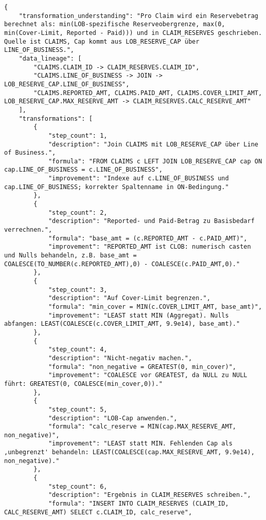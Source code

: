 \begin{lstlisting}[caption={Ausgabe: GPT-5 Anwendungsfall 10 Hauptdurchlauf},label={gpt_case10_prompt1}]
{
    "transformation_understanding": "Pro Claim wird ein Reservebetrag berechnet als: min(LOB-spezifische Reserveobergrenze, max(0, min(Cover-Limit, Reported - Paid))) und in CLAIM_RESERVES geschrieben. Quelle ist CLAIMS, Cap kommt aus LOB_RESERVE_CAP über LINE_OF_BUSINESS.",
    "data_lineage": [
        "CLAIMS.CLAIM_ID -> CLAIM_RESERVES.CLAIM_ID",
        "CLAIMS.LINE_OF_BUSINESS -> JOIN -> LOB_RESERVE_CAP.LINE_OF_BUSINESS",
        "CLAIMS.REPORTED_AMT, CLAIMS.PAID_AMT, CLAIMS.COVER_LIMIT_AMT, LOB_RESERVE_CAP.MAX_RESERVE_AMT -> CLAIM_RESERVES.CALC_RESERVE_AMT"
    ],
    "transformations": [
        {
            "step_count": 1,
            "description": "Join CLAIMS mit LOB_RESERVE_CAP über Line of Business.",
            "formula": "FROM CLAIMS c LEFT JOIN LOB_RESERVE_CAP cap ON cap.LINE_OF_BUSINESS = c.LINE_OF_BUSINESS",
            "improvement": "Indexe auf c.LINE_OF_BUSINESS und cap.LINE_OF_BUSINESS; korrekter Spaltenname in ON-Bedingung."
        },
        {
            "step_count": 2,
            "description": "Reported- und Paid-Betrag zu Basisbedarf verrechnen.",
            "formula": "base_amt = (c.REPORTED_AMT - c.PAID_AMT)",
            "improvement": "REPORTED_AMT ist CLOB: numerisch casten und Nulls behandeln, z.B. base_amt = COALESCE(TO_NUMBER(c.REPORTED_AMT),0) - COALESCE(c.PAID_AMT,0)."
        },
        {
            "step_count": 3,
            "description": "Auf Cover-Limit begrenzen.",
            "formula": "min_cover = MIN(c.COVER_LIMIT_AMT, base_amt)",
            "improvement": "LEAST statt MIN (Aggregat). Nulls abfangen: LEAST(COALESCE(c.COVER_LIMIT_AMT, 9.9e14), base_amt)."
        },
        {
            "step_count": 4,
            "description": "Nicht-negativ machen.",
            "formula": "non_negative = GREATEST(0, min_cover)",
            "improvement": "COALESCE vor GREATEST, da NULL zu NULL führt: GREATEST(0, COALESCE(min_cover,0))."
        },
        {
            "step_count": 5,
            "description": "LOB-Cap anwenden.",
            "formula": "calc_reserve = MIN(cap.MAX_RESERVE_AMT, non_negative)",
            "improvement": "LEAST statt MIN. Fehlenden Cap als ,unbegrenzt' behandeln: LEAST(COALESCE(cap.MAX_RESERVE_AMT, 9.9e14), non_negative)."
        },
        {
            "step_count": 6,
            "description": "Ergebnis in CLAIM_RESERVES schreiben.",
            "formula": "INSERT INTO CLAIM_RESERVES (CLAIM_ID, CALC_RESERVE_AMT) SELECT c.CLAIM_ID, calc_reserve",

\end{lstlisting}
